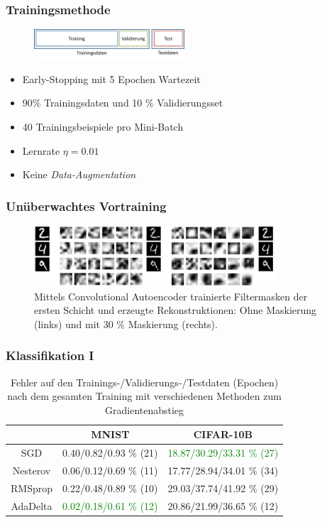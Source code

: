 \documentclass{beamer}
\begin{document}
\begin{frame}
\frametitle{Trainingsmethode}
\begin{figure}
\centering
\includegraphics[width=0.5\textwidth]{images/experiments/6_validationset}
\end{figure}
\begin{itemize}
\item Early-Stopping mit 5 Epochen Wartezeit
\item 90\% Trainingsdaten und 10 \% Validierungsset
\item 40 Trainingsbeispiele pro Mini-Batch
\item Lernrate $\eta = 0.01$
\item Keine \textit{Data-Augmentation}
\end{itemize}
\end{frame}


\begin{frame}
\frametitle{Unüberwachtes Vortraining}
\begin{figure}
\centering
\includegraphics[width=0.8\textwidth]{images/experiments/6_mnist_autoencoder_combined}
\caption{Mittels Convolutional Autoencoder trainierte Filtermasken der ersten Schicht und erzeugte Rekonstruktionen: Ohne Maskierung (links) und mit 30 \% Maskierung (rechts).}
\end{figure}
\end{frame}


\begin{frame}
\frametitle{Klassifikation I}
\begin{table}
\centering
\begin{tabular}{c|c|c}
 	 			&   MNIST							& CIFAR-10B						 		\\ 
\hline SGD		&  0.40/0.82/0.93 \% (21)	&	\textcolor{green}{18.87/30.29/33.31 \% (27)}		\\
\hline Nesterov &  0.06/0.12/0.69 \% (11)	&	17.77/28.94/34.01 \% (34)				\\
\hline RMSprop  &  0.22/0.48/0.89 \% (10)	&	29.03/37.74/41.92 \% (29)				\\
\hline AdaDelta &  \textcolor{green}{0.02/0.18/0.61 \% (12)}	&	20.86/21.99/36.65 \% (12)				\\

\end{tabular} 
\caption{Fehler auf den Trainings-/Validierungs-/Testdaten (Epochen) nach dem gesamten Training mit verschiedenen Methoden zum Gradientenabstieg}
\label{tab:6_gradientdescent}
\end{table}
\end{frame}
\end{document}
